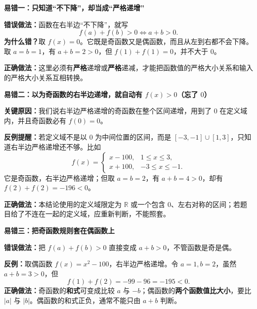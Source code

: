 \clearpage
\begin{trapbox}
\textbf{\textcolor{CTrap}{易错一：只知道“不下降”，却当成“严格递增”}}



\textbf{错误做法：}函数在右半边“不下降”，就写
\[
 f(a)+f(b)>0\iff a+b>0.
\]
\textbf{为什么错？}取 $f(x)=0$。它既是奇函数又是偶函数，而且从左到右都不会下降。取 $a=b=1$，有 $a+b=2>0$，但 $f(1)+f(1)=0$，并不大于 $0$。

\textbf{正确做法：}这里必须有\textbf{严格}递增或\textbf{严格}递减，才能把函数值的严格大小关系和输入的严格大小关系互相转换。

\medskip

\end{trapbox}
\clearpage
\begin{trapbox}
\textbf{\textcolor{CTrap}{易错二：以为奇函数的右半边递增，就自动有 $f(x)>0$（忘了 $0$）}}



\textbf{关键原因：}我们说右半边严格递增的奇函数在整个区间递增，用到了 $0$ 在定义域内，并且奇函数必有 $f(0)=0$。

\textbf{反例提醒：}若定义域不是以 $0$ 为中间位置的区间，而是 $[-3,-1]\cup[1,3]$，只知道右半边严格递增还不够。比如
\[
 f(x)=\begin{cases}x-100,&1\leqslant x\leqslant3,\\x+100,&-3\leqslant x\leqslant-1.\end{cases}
\]
它是奇函数，右半边严格递增；但取 $a=b=2$，有 $a+b=4>0$，却有 $f(2)+f(2)=-196<0$。

\textbf{正确做法：}本结论使用的定义域限定为 $\mathbb R$ 或一个包含 $0$、左右对称的区间；若题目给了不连在一起的定义域，应重新判断，不能照套。

\medskip

\end{trapbox}
\clearpage
\begin{trapbox}
\textbf{\textcolor{CTrap}{易错三：把奇函数规则套在偶函数上}}



\textbf{错误做法：}把 $f(a)+f(b)>0$ 直接变成 $a+b>0$，不管函数是奇是偶。

\textbf{反例：}取偶函数 $f(x)=x^2-100$，右半边严格递增。令 $a=1,b=2$，虽然 $a+b=3>0$，但
\[
 f(1)+f(2)=-99-96=-195<0.
\]
\textbf{正确做法：}奇函数的\textbf{和式}可变成比较 $a$ 与 $-b$；偶函数的\textbf{两个函数值比大小}，要比 $|a|$ 与 $|b|$。偶函数的和式正负，通常不能只由 $a+b$ 判断。

\medskip

\end{trapbox}
